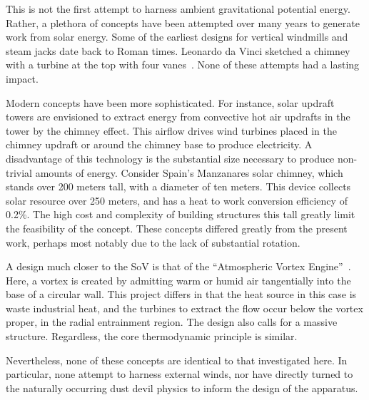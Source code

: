 This is not the first attempt to harness ambient gravitational potential
energy. Rather, a plethora of concepts have been attempted over many
years to generate work from solar energy. 
%
%
%
Some of the earliest designs for vertical windmills and steam jacks date
back to Roman times\cite{hills1996power}. Leonardo da Vinci sketched a
chimney with a turbine at the top with four
vanes~\cite{lugt1983vortex}. None of these attempts had a lasting impact. 

% 

%
%
Modern concepts have been more sophisticated. For instance, solar
updraft towers are envisioned to extract energy from convective hot air
updrafts in the tower by the chimney effect. This airflow drives wind
turbines placed in the chimney updraft or around the chimney base to
produce electricity. A disadvantage of this technology is the
substantial size necessary to produce non-trivial amounts of energy. 
%
%
Consider Spain's Manzanares solar chimney, which stands over 200 meters
tall, with a diameter of ten meters. This device collects solar
resource over 250 meters, and has a heat to work conversion efficiency
of 0.2\%\cite{schlaich2005design}. The high cost and complexity of
building structures this tall greatly limit the feasibility of the
concept. These concepts differed greatly from the present work, perhaps
most notably due to the lack of substantial rotation. 

%
%
A design much closer to the SoV is that of the ``Atmospheric Vortex
Engine''~\cite{vortex_engine,michaud2006atmospheric}. Here, a vortex is
created by admitting warm or humid air tangentially into the base of a
circular wall. This project differs in that the heat source in this case
is waste industrial heat, and the turbines to extract
the flow occur below the vortex proper, in the radial entrainment
region. The design also calls for a massive structure. Regardless, the
core thermodynamic principle is similar.   

Nevertheless, none of these concepts are identical to that investigated
here. In particular, none attempt to harness external winds, nor have
directly turned to the naturally occurring dust devil physics to inform
the design of the apparatus.  

%
%
%
%
%
%
%
%
